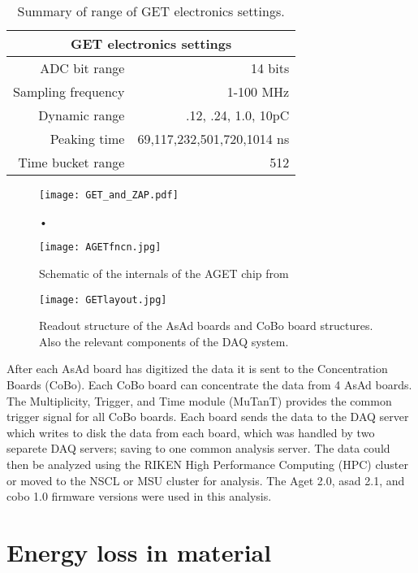 \begin{table*}[!htb]
\centering
{}
\begin{tabular}{@{}rr@{}}\toprule 
\multicolumn{2}{c}{GET electronics settings}\\
\midrule
ADC bit range       & 14 bits \\
Sampling frequency  & 1-100 MHz \\
Dynamic range       & .12, .24, 1.0, 10pC \\
Peaking time        & 69,117,232,501,720,1014 ns \\
Time bucket range   & 512\\
\bottomrule
\end{tabular}
\caption{Summary of range of GET electronics settings. }
\label{tb:getoverview}
\end{table*}

\begin{figure}[!htb]
\centering
\texttt{[image: GET\_and\_ZAP.pdf]}
\caption{•}
\label{fig:getzap}
\end{figure}



\begin{figure}[!htb]
\centering
\texttt{[image: AGETfncn.jpg]}
\caption{Schematic of the internals of the AGET chip from \cite{get2}}
\label{fig:aget}
\end{figure}


\begin{figure}[!htb]
\centering
\texttt{[image: GETlayout.jpg]}
\caption{Readout structure of the AsAd boards and CoBo board structures. Also the relevant components of the DAQ system.}
\label{fig:coboDAQ}
\end{figure}

After each AsAd board has digitized the data it is sent to the Concentration Boards (CoBo). Each CoBo board can concentrate the data from 4 AsAd boards. The Multiplicity, Trigger, and Time module (MuTanT) \cite{get} provides the common trigger signal for all CoBo boards.  Each board sends the data to the DAQ server which writes to disk the data from each board, which was handled by two separete DAQ servers; saving to one common analysis server. The data could then be analyzed using the RIKEN High Performance Computing (HPC) cluster or moved to the NSCL or MSU cluster for analysis. The Aget 2.0, asad 2.1, and cobo 1.0 firmware versions were used in this analysis. 

\section{Energy loss in material}
\label{sec:energyloss}

